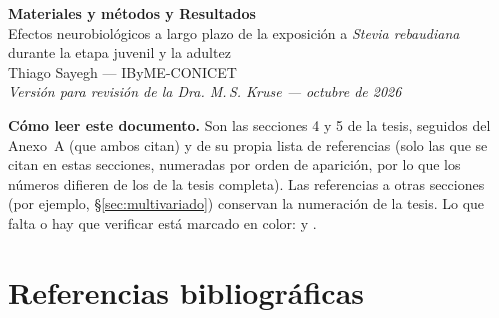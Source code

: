 \documentclass[12pt,a4paper,oneside]{report}
\begin{document}

\begin{center}
  {\Large\textbf{Materiales y métodos y Resultados}}\\[0.6em]
  {\large Efectos neurobiológicos a largo plazo de la exposición a \textit{Stevia rebaudiana}\\ durante la etapa juvenil y la adultez}\\[0.6em]
  Thiago Sayegh --- IByME-CONICET\\[0.3em]
  \textit{Versión para revisión de la Dra. M.\,S. Kruse --- octubre de 2026}
\end{center}

\vspace{0.8em}
\noindent\textbf{Cómo leer este documento.} Son las secciones 4 y 5 de la tesis, seguidos del Anexo~A (que ambos citan) y de su propia lista de referencias (solo las que se citan en estas secciones, numeradas por orden de aparición, por lo que los números difieren de los de la tesis completa). Las referencias a otras secciones (por ejemplo, \S\ref{sec:multivariado}) conservan la numeración de la tesis. Lo que falta o hay que verificar está marcado en color:  y .

\clearpage
\setcounter{chapter}{3}





\chapter*{Referencias bibliográficas}
\printbibliography[heading=none]
\end{document}
